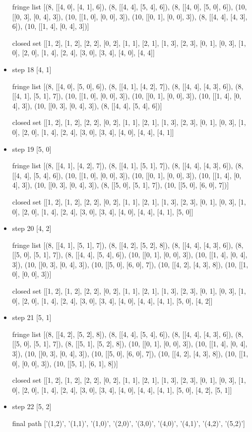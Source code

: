 \documentclass[aps,letterpaper,10pt]{revtex4}
\begin{document}
\begin{itemize}
fringe list
[(8, [[4, 0], [4, 1], 6]), (8, [[4, 4], [5, 4], 6]), (8, [[4, 0], [5, 0], 6]), (10, [[0, 3], [0, 4], 3]), (10, [[1, 0], [0, 0], 3]), (10, [[0, 1], [0, 0], 3]), (8, [[4, 4], [4, 3], 6]), (10, [[1, 4], [0, 4], 3])]


closed set
[[1, 2], [1, 2], [2, 2], [0, 2], [1, 1], [2, 1], [1, 3], [2, 3], [0, 1], [0, 3], [1, 0], [2, 0], [1, 4], [2, 4], [3, 0], [3, 4], [4, 0], [4, 4]]


\item step 18
[4, 1]


fringe list
[(8, [[4, 0], [5, 0], 6]), (8, [[4, 1], [4, 2], 7]), (8, [[4, 4], [4, 3], 6]), (8, [[4, 1], [5, 1], 7]), (10, [[1, 0], [0, 0], 3]), (10, [[0, 1], [0, 0], 3]), (10, [[1, 4], [0, 4], 3]), (10, [[0, 3], [0, 4], 3]), (8, [[4, 4], [5, 4], 6])]


closed set
[[1, 2], [1, 2], [2, 2], [0, 2], [1, 1], [2, 1], [1, 3], [2, 3], [0, 1], [0, 3], [1, 0], [2, 0], [1, 4], [2, 4], [3, 0], [3, 4], [4, 0], [4, 4], [4, 1]]


\item step 19
[5, 0]


fringe list
[(8, [[4, 1], [4, 2], 7]), (8, [[4, 1], [5, 1], 7]), (8, [[4, 4], [4, 3], 6]), (8, [[4, 4], [5, 4], 6]), (10, [[1, 0], [0, 0], 3]), (10, [[0, 1], [0, 0], 3]), (10, [[1, 4], [0, 4], 3]), (10, [[0, 3], [0, 4], 3]), (8, [[5, 0], [5, 1], 7]), (10, [[5, 0], [6, 0], 7])]


closed set
[[1, 2], [1, 2], [2, 2], [0, 2], [1, 1], [2, 1], [1, 3], [2, 3], [0, 1], [0, 3], [1, 0], [2, 0], [1, 4], [2, 4], [3, 0], [3, 4], [4, 0], [4, 4], [4, 1], [5, 0]]


\item step 20
[4, 2]


fringe list
[(8, [[4, 1], [5, 1], 7]), (8, [[4, 2], [5, 2], 8]), (8, [[4, 4], [4, 3], 6]), (8, [[5, 0], [5, 1], 7]), (8, [[4, 4], [5, 4], 6]), (10, [[0, 1], [0, 0], 3]), (10, [[1, 4], [0, 4], 3]), (10, [[0, 3], [0, 4], 3]), (10, [[5, 0], [6, 0], 7]), (10, [[4, 2], [4, 3], 8]), (10, [[1, 0], [0, 0], 3])]


closed set
[[1, 2], [1, 2], [2, 2], [0, 2], [1, 1], [2, 1], [1, 3], [2, 3], [0, 1], [0, 3], [1, 0], [2, 0], [1, 4], [2, 4], [3, 0], [3, 4], [4, 0], [4, 4], [4, 1], [5, 0], [4, 2]]  


\item step 21
[5, 1]


fringe list
[(8, [[4, 2], [5, 2], 8]), (8, [[4, 4], [5, 4], 6]), (8, [[4, 4], [4, 3], 6]), (8, [[5, 0], [5, 1], 7]), (8, [[5, 1], [5, 2], 8]), (10, [[0, 1], [0, 0], 3]), (10, [[1, 4], [0, 4], 3]), (10, [[0, 3], [0, 4], 3]), (10, [[5, 0], [6, 0], 7]), (10, [[4, 2], [4, 3], 8]), (10, [[1, 0], [0, 0], 3]), (10, [[5, 1], [6, 1], 8])]


closed set
[[1, 2], [1, 2], [2, 2], [0, 2], [1, 1], [2, 1], [1, 3], [2, 3], [0, 1], [0, 3], [1, 0], [2, 0], [1, 4], [2, 4], [3, 0], [3, 4], [4, 0], [4, 4], [4, 1], [5, 0], [4, 2], [5, 1]]


\item step 22
[5, 2]


final path
['(1,2)', '(1,1)', '(1,0)', '(2,0)', '(3,0)', '(4,0)', '(4,1)', '(4,2)', '(5,2)']
\end{itemize}
\end{document}
